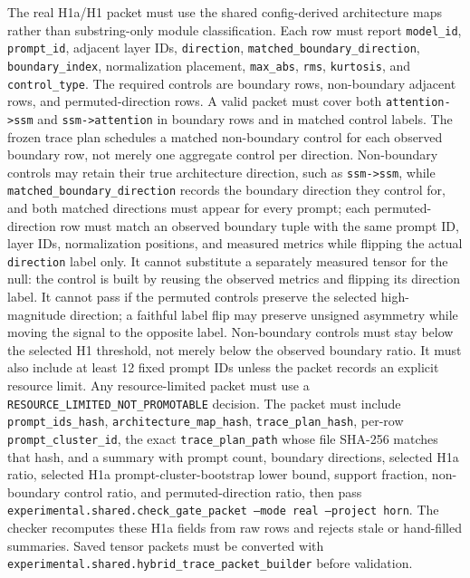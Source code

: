\documentclass{article}
\begin{document}
The real H1a/H1 packet must use the shared config-derived architecture maps rather
than substring-only module classification. Each row must report
\texttt{model\_id}, \texttt{prompt\_id}, adjacent layer IDs, \texttt{direction},
\texttt{matched\_boundary\_direction}, \texttt{boundary\_index}, normalization placement, \texttt{max\_abs},
\texttt{rms}, \texttt{kurtosis}, and \texttt{control\_type}. The required
controls are boundary rows, non-boundary adjacent rows, and permuted-direction
rows. A valid packet must cover both \texttt{attention->ssm} and
\texttt{ssm->attention} in boundary rows and in matched control labels.
The frozen trace plan schedules a matched non-boundary control for each
observed boundary row, not merely one aggregate control per direction.
Non-boundary controls may retain their true architecture direction, such as
\texttt{ssm->ssm}, while \texttt{matched\_boundary\_direction} records the
boundary direction they control for, and both matched directions must appear
for every prompt; each
permuted-direction row must match an observed boundary tuple with the same
prompt ID, layer IDs, normalization positions, and measured metrics while
flipping the actual \texttt{direction} label only. It cannot
substitute a separately measured tensor for the null: the control is built by
reusing the observed metrics and flipping its direction label. It cannot
pass if the permuted controls preserve the selected high-magnitude direction;
a faithful label flip may preserve unsigned asymmetry while moving the signal
to the opposite label. Non-boundary controls must stay below the selected H1
threshold, not merely below the observed boundary ratio. It must also
include at least 12 fixed prompt IDs unless
the packet records an explicit resource limit. Any resource-limited packet must
use a \texttt{RESOURCE\_LIMITED\_NOT\_PROMOTABLE} decision. The packet must
include \texttt{prompt\_ids\_hash}, \texttt{architecture\_map\_hash},
\texttt{trace\_plan\_hash}, per-row \texttt{prompt\_cluster\_id}, the exact
\texttt{trace\_plan\_path} whose file
SHA-256 matches that hash, and a
summary with prompt count, boundary directions, selected H1a ratio,
selected H1a prompt-cluster-bootstrap lower bound, support fraction,
non-boundary control ratio, and
permuted-direction ratio, then pass
\texttt{experimental.shared.check\_gate\_packet --mode real --project horn}.
The checker recomputes these H1a fields from raw rows and rejects stale or
hand-filled summaries.
Saved tensor packets must be converted with
\texttt{experimental.shared.hybrid\_trace\_packet\_builder} before validation.
\end{document}
